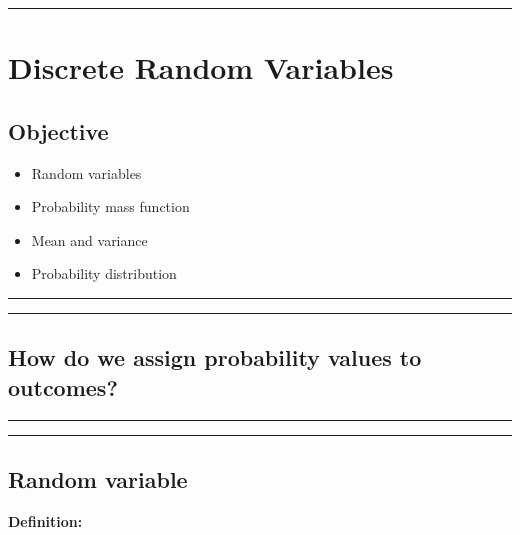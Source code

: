 \documentclass[
]{book}
\providecommand{\tightlist}{%
  \setlength{\itemsep}{0pt}\setlength{\parskip}{0pt}}
\begin{document}
\begin{center}\rule{0.5\linewidth}{0.5pt}\end{center}

\hypertarget{discrete-random-variables}{%
\chapter{Discrete Random Variables}\label{discrete-random-variables}}

\hypertarget{objective-3}{%
\section{Objective}\label{objective-3}}

\begin{itemize}
\tightlist
\item
  Random variables
\item
  Probability mass function
\item
  Mean and variance
\item
  Probability distribution
\end{itemize}

\begin{center}\rule{0.5\linewidth}{0.5pt}\end{center}

\begin{center}\rule{0.5\linewidth}{0.5pt}\end{center}

\hypertarget{how-do-we-assign-probability-values-to-outcomes}{%
\section{How do we assign probability values to outcomes?}\label{how-do-we-assign-probability-values-to-outcomes}}

\begin{center}\rule{0.5\linewidth}{0.5pt}\end{center}

\begin{center}\rule{0.5\linewidth}{0.5pt}\end{center}

\hypertarget{random-variable}{%
\section{Random variable}\label{random-variable}}

\textbf{Definition:}
\end{document}
